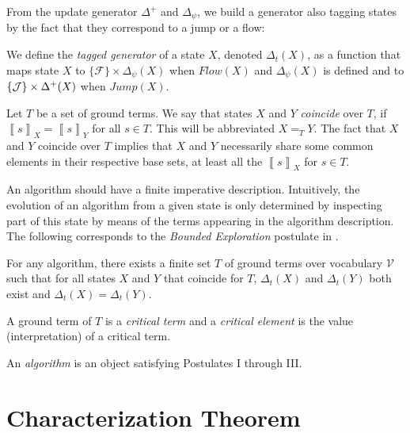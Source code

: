 \documentclass[envcountsame]{llncs}
\newcommand{\Continuous}[1]{\mathit{Flow}(#1)}   \newcommand{\notContinuous}[1]{\mathit{Jump}(#1)}   \newcommand{\Machine}{\textsc{Dynamic}}
\newcommand{\U}{\ensuremath{\mathcal {V}}}
\newcommand{\evaluation}[2][]{\ensuremath{\left\llbracket #2\right\rrbracket_{#1}}}
\newcommand{\val}[2]{\evaluation[#2]{#1}}
\newcommand{\CC}{\mathcal{F}}
\newcommand{\gen}[1]{\Delta_t(#1)}
\newcommand\Deltapsi{\Delta_\psi}
\begin{document}
From the update generator $\Delta^+$ and $\Deltapsi$, we build a
generator also tagging states by the fact that they correspond to a
jump or a flow:

\begin{definition} \label{def:behaviord}
We define the \emph{tagged generator} of a state $X$, denoted $\gen{X}$, as a
function that maps state $X$ to $\{\CC\} \times \Deltapsi(X)$ when
$\Continuous{X}$ and $\Deltapsi(X)$ is defined and to $\{\mathcal{J}\} \times \Delta^+(X)$ when
$\notContinuous{X}$.
\end{definition}







Let $T$ be a set of ground terms.
We say that states $X$ and $Y$ \emph{coincide} over $T$,
if $\val{s}{X}=\val{s}{Y}$ for all $s\in T$.
This will be abbreviated $X =_{T} Y $.
The fact that  $X$ and $Y$ {coincide} over $T$ implies that $X$ and $Y$
necessarily share  some common elements in their
respective base sets,  at least all the $\val{s}{X}$ for $s \in T$.


An algorithm should have a finite imperative description. Intuitively, the evolution
of an algorithm from a given state is only determined by inspecting part of this
state by means of the terms appearing in the algorithm
description. The following
corresponds to the \emph{Bounded Exploration} postulate in
\cite{Gur00}.


\begin{postulatep} \label{postulatetrois}

For any algorithm, there exists a finite set $T$ of ground terms over
  vocabulary $\U$ such that for all states $X$ and $Y$ that coincide
  for $T$,  $\gen{X}$ and $\gen{Y}$ both exist and $\gen{X} = \gen{Y}$.
\end{postulatep}

A ground term of $T$ is a \emph{critical term} and a \emph{critical
  element} is the value (interpretation) of a critical term.



\begin{definition} \label{defalgo}
An \emph{algorithm} is an object satisfying Postulates I through III.
\end{definition}

\section{Characterization Theorem}
\end{document}
